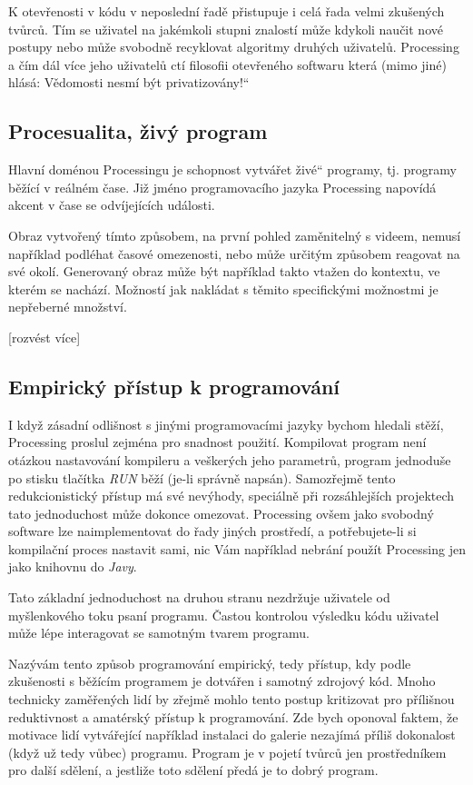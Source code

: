 \documentclass[11pt]{book}
\renewcommand\uv[1]{\quotedblbase #1\textquotedblleft}%
\newcommand{\pododdil}[1]{\subsection{#1}\label{subsec:#1}}
\begin{document}
K otevřenosti v kódu v neposlední řadě přistupuje i celá řada velmi zkušených tvůrců. Tím se uživatel na jakémkoli stupni znalostí může kdykoli naučit nové postupy nebo může svobodně recyklovat algoritmy druhých uživatelů. Processing a čím dál více jeho uživatelů ctí filosofii otevřeného softwaru která (mimo jiné) hlásá: \uv{Vědomosti nesmí být privatizovány!}

\pododdil{Procesualita, živý program}

Hlavní doménou Processingu je schopnost vytvářet \uv{živé} programy, tj. programy běžící v reálném čase. Již jméno programovacího jazyka Processing napovídá akcent v čase se odvíjejících události.

Obraz vytvořený tímto způsobem, na první pohled zaměnitelný s videem, nemusí například podléhat časové omezenosti, nebo může určitým způsobem reagovat na své okolí. Generovaný obraz může být například takto vtažen do kontextu, ve kterém se nachází. Možností jak nakládat s těmito specifickými možnostmi je nepřeberné množství.

[rozvést více]

\pododdil{Empirický přístup k programování}

	I když zásadní odlišnost s jinými programovacími jazyky bychom hledali stěží, Processing proslul zejména pro snadnost použití. Kompilovat program není otázkou nastavování kompileru a veškerých jeho parametrů, program jednoduše po stisku tlačítka {\em RUN} běží (je-li správně napsán). Samozřejmě tento redukcionistický přístup má své nevýhody, speciálně při rozsáhlejších projektech tato jednoduchost může dokonce omezovat. Processing ovšem jako svobodný software lze naimplementovat do řady jiných prostředí, a potřebujete-li si kompilační proces nastavit sami, nic Vám například nebrání použít Processing jen jako knihovnu do {\em Javy}.

Tato základní jednoduchost na druhou stranu nezdržuje uživatele od myšlenkového toku psaní programu. Častou kontrolou výsledku kódu uživatel může lépe interagovat se samotným tvarem programu.

Nazývám tento způsob programování empirický, tedy přístup, kdy podle zkušenosti s běžícím programem je dotvářen i samotný zdrojový kód. Mnoho technicky zaměřených lidí by zřejmě mohlo tento postup kritizovat pro přílišnou reduktivnost a amatérský přístup k programování. Zde bych oponoval faktem, že motivace lidí vytvářející například instalaci do galerie nezajímá příliš dokonalost (když už tedy vůbec) programu. Program je v pojetí tvůrců jen prostředníkem pro další sdělení, a jestliže toto sdělení předá je to dobrý program.
\end{document}
